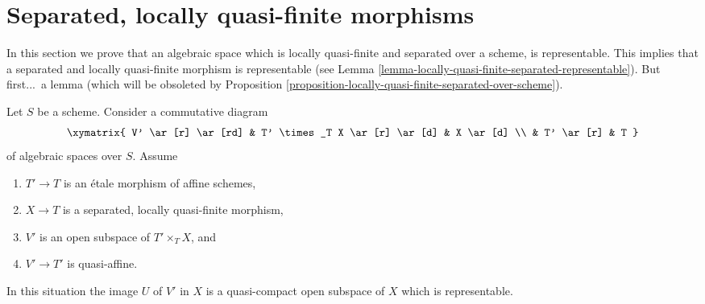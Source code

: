 \section{Separated, locally quasi-finite morphisms}
\label{section-schemehood}

\noindent
In this section we prove that an algebraic space which is locally
quasi-finite and separated over a scheme, is representable. This
implies that a separated and locally quasi-finite morphism is
representable (see
Lemma \ref{lemma-locally-quasi-finite-separated-representable}).
But first...\ a lemma (which will be obsoleted by
Proposition \ref{proposition-locally-quasi-finite-separated-over-scheme}).

\begin{lemma}
\label{lemma-neighbourhood-scheme}
Let $S$ be a scheme. Consider a commutative diagram
$$
\xymatrix{
V' \ar[r] \ar[rd] & T' \times_T X \ar[r] \ar[d] & X \ar[d] \\
& T' \ar[r] & T
}
$$
of algebraic spaces over $S$. Assume
\begin{enumerate}
\item $T' \to T$ is an \'etale morphism of affine schemes,
\item $X \to T$ is a separated, locally quasi-finite morphism,
\item $V'$ is an open subspace of $T' \times_T X$, and
\item $V' \to T'$ is quasi-affine.
\end{enumerate}
In this situation the image $U$ of $V'$ in $X$ is a quasi-compact
open subspace of $X$ which is representable.
\end{lemma}

